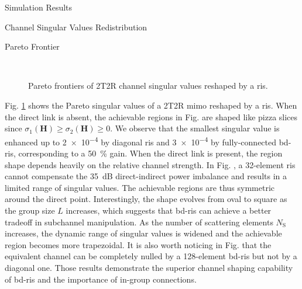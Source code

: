 \documentclass[journal]{IEEEtran}
\begin{document}
\begin{section}{Simulation Results}
	\begin{subsection}{Channel Singular Values Redistribution}
		\begin{subsubsection}{Pareto Frontier}
			\begin{figure}[!t]
				\centering
				\\
				\caption{Pareto frontiers of 2T2R channel singular values reshaped by a \gls{ris}.}
				\label{fg:singular_pareto}
			\end{figure}
			Fig. \ref{fg:singular_pareto} shows the Pareto singular values of a 2T2R \gls{mimo} reshaped by a \gls{ris}.
			When the direct link is absent, the achievable regions in Fig.  are shaped like pizza slices since $\sigma_1(\mathbf{H}) \ge \sigma_2(\mathbf{H}) \ge 0$.
			We observe that the smallest singular value is enhanced up to \num{2e-4} by diagonal \gls{ris} and \num{3e-4} by fully-connected \gls{bd}-\gls{ris}, corresponding to a \qty{50}{\percent} gain.
			When the direct link is present, the region shape depends heavily on the relative channel strength.
			In Fig. , a 32-element \gls{ris} cannot compensate the \qty{35}{dB} direct-indirect power imbalance and results in a limited range of singular values.
			The achievable regions are thus symmetric around the direct point.
			Interestingly, the shape evolves from oval to square as the group size $L$ increases, which suggests that \gls{bd}-\gls{ris} can achieve a better tradeoff in subchannel manipulation.
			As the number of scattering elements $N_\mathrm{S}$ increases, the dynamic range of singular values is widened and the achievable region becomes more trapezoidal.
			It is also worth noticing in Fig.  that the equivalent channel can be completely nulled by a 128-element \gls{bd}-\gls{ris} but not by a diagonal one.
			Those results demonstrate the superior channel shaping capability of \gls{bd}-\gls{ris} and the importance of in-group connections.
		\end{subsubsection}


\end{subsection}
\end{section}
\end{document}
